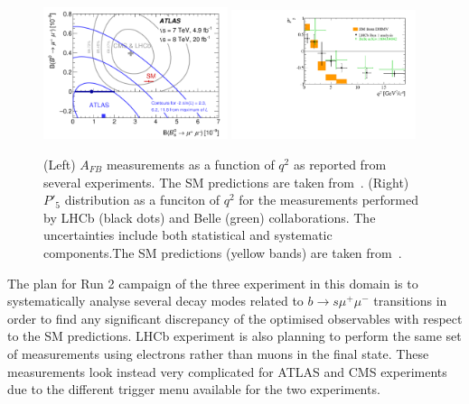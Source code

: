 \documentclass{PoS}
\begin{document}
\begin{figure}[!t]
  \begin{center}
  \includegraphics[width=0.48\textwidth]{fig_09.png}
  \includegraphics[width=0.48\textwidth]{P5p.pdf}
    \caption {(Left) $A_{FB}$ measurements as a function of $q^2$ as reported from several experiments. The SM predictions are taken from~\cite{ABSZ}. (Right) $P'_5$ distribution as a funciton of $q^2$ for the measurements performed by LHCb (black dots) and Belle (green) collaborations. The uncertainties include both statistical and systematic components.The SM predictions (yellow bands) are taken from~\cite{DHMV}. }
        \label{fig:mumuK}
  \end{center}
\end{figure}
The plan for Run 2 campaign of the three experiment in this domain is to systematically analyse several decay modes related to $b \to s \mu^+ \mu^-$  transitions in order to find any significant discrepancy of the optimised observables with respect to the SM predictions. LHCb experiment is also planning to perform the same set of measurements using electrons rather than muons in the final state. These measurements look instead very complicated for ATLAS and CMS experiments due to the different trigger menu available for the two experiments.
\end{document}
